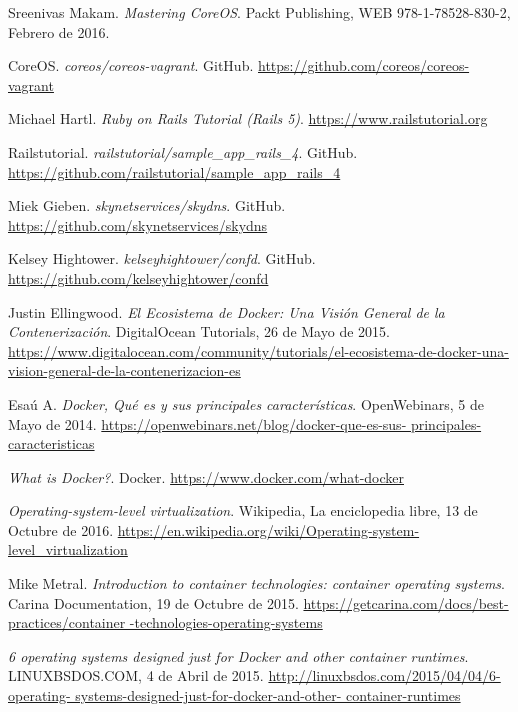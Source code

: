 \begin{thebibliography}{9}
Sreenivas Makam.
\textit{Mastering CoreOS}. 
Packt Publishing, WEB 978-1-78528-830-2, Febrero de 2016.

CoreOS.
\textit{coreos/coreos-vagrant}. GitHub.
\url{https://github.com/coreos/coreos-vagrant}

Michael Hartl.
\textit{Ruby on Rails Tutorial (Rails 5)}. 
\url{https://www.railstutorial.org}

Railstutorial.
\textit{railstutorial/sample\_app\_rails\_4}. GitHub.
\url{https://github.com/railstutorial/sample\_app\_rails\_4}

Miek Gieben.
\textit{skynetservices/skydns}. GitHub.
\url{https://github.com/skynetservices/skydns}

Kelsey Hightower.
\textit{kelseyhightower/confd}. GitHub.
\url{https://github.com/kelseyhightower/confd}

Justin Ellingwood.
\textit{El Ecosistema de Docker: Una Visión General de la Contenerización}. 
DigitalOcean Tutorials, 26 de Mayo de 2015.
\url{https://www.digitalocean.com/community/tutorials/el-ecosistema-de-docker-una-vision-general-de-la-contenerizacion-es}

Esaú A.
\textit{Docker, Qué es y sus principales características}. 
OpenWebinars, 5 de Mayo de 2014.
\url{https://openwebinars.net/blog/docker-que-es-sus-
principales-caracteristicas}

\textit{What is Docker?}. 
Docker.
\url{https://www.docker.com/what-docker}

\textit{Operating-system-level virtualization}. 
Wikipedia, La enciclopedia libre, 13 de Octubre de 2016.
\url{https://en.wikipedia.org/wiki/Operating-system-
level\_virtualization}

Mike Metral.
\textit{Introduction to container technologies: container operating systems}. 
Carina Documentation, 19 de Octubre de 2015.
\url{https://getcarina.com/docs/best-practices/container
-technologies-operating-systems}

\textit{6 operating systems designed just for Docker and other container runtimes}. 
LINUXBSDOS.COM, 4 de Abril de 2015.
\url{http://linuxbsdos.com/2015/04/04/6-operating-
systems-designed-just-for-docker-and-other-
container-runtimes}


\end{thebibliography}
